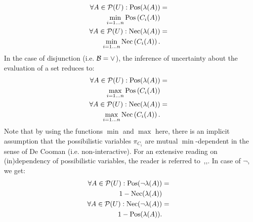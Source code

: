 \begin{eqnarray}
\label{eq:conjunctive1}
\forall A\in\mathcal{P}(U):\operatorname{Pos}(\lambda(A))&=\\
\nonumber
\min_{i=1 \ldots n}\operatorname{Pos}\left(C_i(A)\right)\\
\label{eq:conjunctive2}
\forall A\in\mathcal{P}(U):\operatorname{Nec}(\lambda(A))&=\\
\nonumber
\min_{i=1 \ldots n}\operatorname{Nec}\left(C_i(A)\right).
\end{eqnarray}
In the case of disjunction (i.e. $\operatorname*{\mathcal{B}}=\vee$), the inference of uncertainty about the evaluation of a set reduces to:
\begin{eqnarray}
\label{eq:disjunctive}
\forall A\in\mathcal{P}(U):\operatorname{Pos}(\lambda(A))&=\\
\nonumber
\max_{i=1 \ldots n}\operatorname{Pos}\left(C_i(A)\right)\\
\forall A\in\mathcal{P}(U):\operatorname{Nec}(\lambda(A))&=\\
\nonumber
\max_{i=1 \ldots n}\operatorname{Nec}\left(C_i(A)\right).
\end{eqnarray}
Note that by using the functions $\min$ and $\max$ here, there is an implicit assumption that the possibilistic variables $\pi_{C_i}$ are mutual $\min$-dependent in the sense of De Cooman (i.e. non-interactive). For an extensive reading on (in)dependency of possibilistic variables, the reader is referred to~\cite{GertDeCooman1997b},\cite{GertDeCooman1997a},\cite{GertDeCooman1997}. In case of $\neg$, we get:
\begin{eqnarray}
\label{eq:negation}
\forall A\in\mathcal{P}(U):\operatorname{Pos}(\neg\lambda(A))&=\\
\nonumber
1-\operatorname{Nec}(\lambda(A))\\
\forall A\in\mathcal{P}(U):\operatorname{Nec}(\neg\lambda(A))&=\\
\nonumber
1-\operatorname{Pos}(\lambda(A)).
\end{eqnarray}


